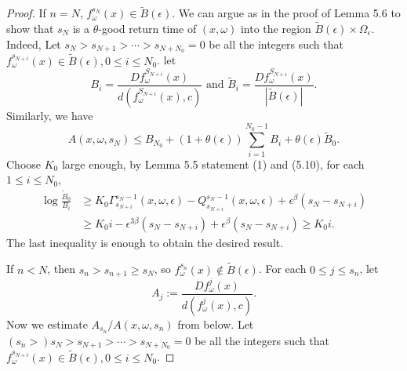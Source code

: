 \documentclass[11pt,oneside]{article}
\theoremstyle{plain}
\numberwithin{equation}{section}
\numberwithin{figure}{section}
\numberwithin{table}{section}
\begin{document}
\begin{proof}
If $n = N$, $f_{\omega}^{s_N}(x) \in \tilde B(\epsilon) $. We can argue as in the proof of Lemma 5.6 to show that $s_N$ is a $\theta$-good return time of $(x, \omega)$ into the region $\tilde B(\epsilon) \times \Omega_{\epsilon}$. Indeed, Let $s_N > s_{N+1} > \cdots > s_{N+N_0} = 0$ be all the integers such that $f_{\omega}^{s_{N+i}}(x) \in \tilde B(\epsilon), 0 \leq i \leq N_0$. let 
\[
B_i = \frac{Df_{\omega}^{S_{N+i}}(x)}{d(f_{\omega}^{S_{N+i}}(x), c)} \mbox{ and } \tilde B_i = \frac{Df_{\omega}^{S_{N+i}}(x)}{|\tilde B(\epsilon)|}.
\]
Similarly, we have
\[
A(x, \omega, s_N) \leq B_{N_0} + (1+\theta(\epsilon)) \sum_{i = 1}^{N_0 -1} B_i + \theta(\epsilon) \tilde B_0.
\]
Choose $K_0$ large enough, by Lemma 5.5 statement (1) and (5.10), for each $1 \leq i \leq N_0$,
\begin{align*}
\log \frac{\tilde B_0}{B_i}& \geq K_0 \Gamma_{s_{N+i}}^{s_N-1} (x, \omega, \epsilon) - Q_{s_{N+i}}^{s_N-1} (x, \omega, \epsilon) + \epsilon^{\beta}(s_N - s_{N+i})\\
&  \geq K_0 i  - \epsilon^{3 \beta} (s_N - s_{N+i}) + \epsilon^{\beta} (s_N - s_{N+i}) \geq K_0 i.
\end{align*}
The last inequality is enough to obtain the desired result.


If $n < N$, then $s_n > s_{n+1} \geq s_N$, so $f_{\omega}^{s_n} (x) \notin \tilde B(\epsilon)$. For each $0 \leq j \leq s_n$, let 
\[
A_j := \frac{D f_{\omega}^j(x)}{ d(f_{\omega}^j(x), c)}.
\]
Now we estimate $A_{s_n} / A(x, \omega, s_n)$ from below. Let $( s_n > ) s_N > s_{N+1} > \cdots > s_{N+N_0} = 0$ be all the integers such that $f_{\omega}^{s_{N+i}}(x) \in \tilde B(\epsilon), 0 \leq i \leq N_0$. 



\end{proof}
\end{document}
